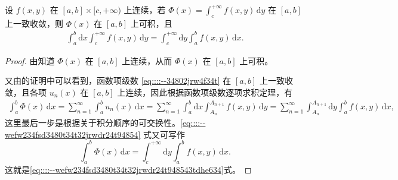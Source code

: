 \documentclass[../../main.tex]{subfiles}
\begin{document}
\begin{theorem}[可积性]\label{theorem:含参量反常积分可积性定理}
设 \( f(x,y) \) 在 \( [a,b] \times [c, +\infty) \) 上连续，若 \( \Phi(x) = \int_{c}^{+\infty} f(x,y) \, \mathrm{d}y \) 在 \( [a,b] \) 上一致收敛，则 \( \Phi(x) \) 在 \( [a,b] \) 上可积，且
\begin{align}\label{eq::::--wefw234fsd3480t34t32jrwdr24t948543tdhe634}
\int_{a}^{b} \mathrm{d}x \int_{c}^{+\infty} f(x,y) \, \mathrm{d}y = \int_{c}^{+\infty} \mathrm{d}y \int_{a}^{b} f(x,y) \, \mathrm{d}x.
\end{align}
\end{theorem}
\begin{proof}
由知道 \( \Phi(x) \) 在 \( [a,b] \) 上连续，从而 \( \Phi(x) \) 在 \( [a,b] \) 上可积。

又由的证明中可以看到，函数项级数 \eqref{eq::::--34802jrw4f34t} 在 \( [a,b] \) 上一致收敛，且各项 \( u_n(x) \) 在 \( [a,b] \) 上连续，因此根据函数项级数逐项求积定理，有
\begin{align}\label{eq::::--wefw234fsd3480t34t32jrwdr24t94854}
\int_{a}^{b} \Phi(x) \, \mathrm{d}x = \sum_{n=1}^{\infty} \int_{a}^{b} u_n(x) \, \mathrm{d}x = \sum_{n=1}^{\infty} \int_{a}^{b} \mathrm{d}x \int_{A_n}^{A_{n+1}} f(x,y) \, \mathrm{d}y = \sum_{n=1}^{\infty} \int_{A_n}^{A_{n+1}} \mathrm{d}y \int_{a}^{b} f(x,y) \, \mathrm{d}x,
\end{align}
这里最后一步是根据关于积分顺序的可交换性。\eqref{eq::::--wefw234fsd3480t34t32jrwdr24t94854} 式又可写作
\[
\int_{a}^{b} \Phi(x) \, \mathrm{d}x = \int_{c}^{+\infty} \mathrm{d}y \int_{a}^{b} f(x,y) \, \mathrm{d}x.
\]
这就是\eqref{eq::::--wefw234fsd3480t34t32jrwdr24t948543tdhe634}式。

\end{proof}
\end{document}
